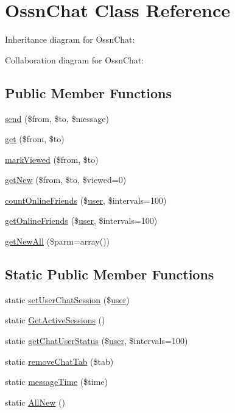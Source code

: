 \hypertarget{class_ossn_chat}{}\section{Ossn\+Chat Class Reference}
\label{class_ossn_chat}


Inheritance diagram for Ossn\+Chat\+:


Collaboration diagram for Ossn\+Chat\+:
\subsection*{Public Member Functions}
\begin{DoxyCompactItemize}
\item 
\hyperlink{class_ossn_chat_a3e5128f5d2857f5ff72e6ec15455a2a6}{send} (\$from, \$to, \$message)
\item 
\hyperlink{class_ossn_chat_ac375857b49f863c35a6ee8e16f7ab3ab}{get} (\$from, \$to)
\item 
\hyperlink{class_ossn_chat_af9e75a329022d58cdf3742ca19ebda68}{mark\+Viewed} (\$from, \$to)
\item 
\hyperlink{class_ossn_chat_afaaef0fcadfb9521efb2f49ebdb25fbc}{get\+New} (\$from, \$to, \$viewed=0)
\item 
\hyperlink{class_ossn_chat_a36fba0593d9b24dd1a0c569739374e59}{count\+Online\+Friends} (\$\hyperlink{ossn_8config_8db_8example_8php_a802544b7ba9f79bbf24ef67773d53bed}{user}, \$intervals=100)
\item 
\hyperlink{class_ossn_chat_a49c696d1fc17fe21d0bedfc6d61f7146}{get\+Online\+Friends} (\$\hyperlink{ossn_8config_8db_8example_8php_a802544b7ba9f79bbf24ef67773d53bed}{user}, \$intervals=100)
\item 
\hyperlink{class_ossn_chat_a22a4d0bf8b3e52af9130a8cf0a5c595e}{get\+New\+All} (\$parm=array())
\end{DoxyCompactItemize}
\subsection*{Static Public Member Functions}
\begin{DoxyCompactItemize}
\item 
static \hyperlink{class_ossn_chat_a50c65b155bccbc9ed2fdd4f527650b0c}{set\+User\+Chat\+Session} (\$\hyperlink{ossn_8config_8db_8example_8php_a802544b7ba9f79bbf24ef67773d53bed}{user})
\item 
static \hyperlink{class_ossn_chat_ab7560516e7bbdae5aa7529f3d9fa870a}{Get\+Active\+Sessions} ()
\item 
static \hyperlink{class_ossn_chat_a301019bda337dbac5509003719e3b822}{get\+Chat\+User\+Status} (\$\hyperlink{ossn_8config_8db_8example_8php_a802544b7ba9f79bbf24ef67773d53bed}{user}, \$intervals=100)
\item 
static \hyperlink{class_ossn_chat_adebcbd6e03a2d2b4d2f023e16a634da2}{remove\+Chat\+Tab} (\$tab)
\item 
static \hyperlink{class_ossn_chat_a87143a6bcfa6f925984aea61c01e9586}{message\+Time} (\$time)
\item 
static \hyperlink{class_ossn_chat_a2cf575b75a8fd733d3a1dc0548ece5d6}{All\+New} ()
\end{DoxyCompactItemize}


